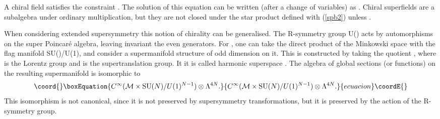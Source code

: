 \documentclass[a4paper,12pt]{article}
\begin{document}
A chiral field \cite{fwz} satisfies the constraint \coordHE{}. 
The solution of this equation can be written (after a change of variables)
as 
\coordHE{}. Chiral superfields are a subalgebra under  ordinary
multiplication,
but they are not  closed under the star product
defined with (\ref{spb2}) unless \coordHE{}. 

\bigskip




When considering extended supersymmetry this notion of chirality can be 
generalised.  The R-symmetry group
  U(\coordHE{}) acts   by automorphisms on the super 
Poincar\'e algebra, leaving invariant the even generators. For \coordHE{},
one can take the direct product of the Minkowski space with the flag
manifold
SU(\coordHE{})/U(1)\coordHE{}, and consider a  supermanifold structure of odd 
dimension 
\coordHE{} on it. This is constructed by taking the quotient 
\coordHE{},
where \coordHE{} is the Lorentz group and \coordHE{} is the
supertranslation group.
 It it is called harmonic superspace \cite{gikos}.
 The algebra of global sections (or functions) on the
resulting supermanifold is isomorphic to 
 \begin{equation}\coord{}\boxEquation{
C^\infty(\mathcal{M}\times
 \hbox{SU}(N)/U(1)^{N-1})\otimes \Lambda^{4N}.
\label{hs}
}{
C^\infty(\mathcal{M}\times
 \hbox{SU}(N)/U(1)^{N-1})\otimes \Lambda^{4N}.
}{ecuacion}\coordE{}\end{equation}
This isomorphism is not canonical,
 since it is not preserved by supersymmetry transformations, but it is
preserved 
by the action of the R-symmetry group.  
\end{document}
